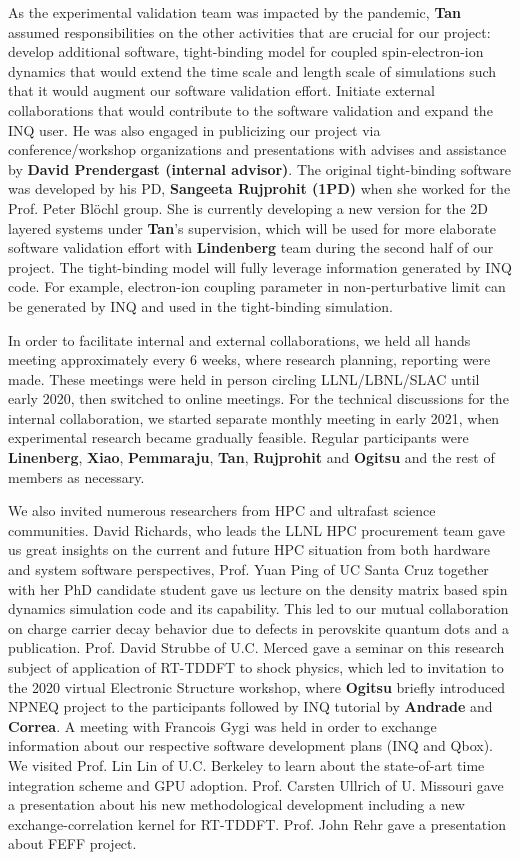 As the experimental validation team was impacted by the pandemic, {\bf Tan} assumed responsibilities on the other activities that are crucial for our project: develop additional software, tight-binding model for coupled spin-electron-ion dynamics that would extend the time scale and length scale of simulations such that it would augment our software validation effort. Initiate external collaborations that would contribute to the software validation and expand the INQ user. He was also engaged in publicizing our project via conference/workshop organizations and presentations with advises and assistance by {\bf David Prendergast (internal advisor)}.  The original tight-binding software was developed by his PD, {\bf Sangeeta Rujprohit (1PD)} when she worked for the Prof. Peter Bl\"{o}chl group. She is currently developing a new version for the 2D layered systems under {\bf Tan}'s supervision, which will be used for more elaborate software validation effort with {\bf Lindenberg} team during the second half of our project. The tight-binding model will fully leverage information generated by INQ code. For example, electron-ion coupling parameter in non-perturbative limit can be generated by INQ and used in the tight-binding simulation. 

In order to facilitate internal and external collaborations, we held all hands meeting approximately every 6 weeks, where research planning, reporting were made. These meetings were held in person circling LLNL/LBNL/SLAC until early 2020, then switched to online meetings. For the technical discussions for the internal collaboration, we started separate monthly meeting in early 2021, when experimental research became gradually feasible. Regular participants were {\bf Linenberg}, {\bf Xiao}, {\bf Pemmaraju}, {\bf Tan}, {\bf Rujprohit} and {\bf Ogitsu} and the rest of members as necessary.

We also invited numerous researchers from HPC and ultrafast science communities. David Richards, who leads the LLNL HPC procurement team gave us great insights on the current and future HPC situation from both hardware and system software perspectives, Prof. Yuan Ping of UC Santa Cruz together with her PhD candidate student gave us lecture on the density matrix based spin dynamics simulation code and its capability. This led to our mutual collaboration on charge carrier decay behavior due to defects in perovskite quantum dots and a publication. Prof. David Strubbe of U.C. Merced gave a seminar on this research subject of application of RT-TDDFT to shock physics, which led to invitation to the 2020 virtual Electronic Structure workshop, where {\bf Ogitsu} briefly introduced NPNEQ project to the participants followed by INQ tutorial by {\bf Andrade} and {\bf Correa}. A meeting with Francois Gygi was held in order to exchange information about our respective software development plans (INQ and Qbox). We visited Prof. Lin Lin of U.C. Berkeley to learn about the state-of-art time integration scheme and GPU adoption. Prof. Carsten Ullrich of U. Missouri gave a presentation about his new methodological development including a new exchange-correlation kernel for RT-TDDFT. Prof. John Rehr gave a presentation about FEFF project.


